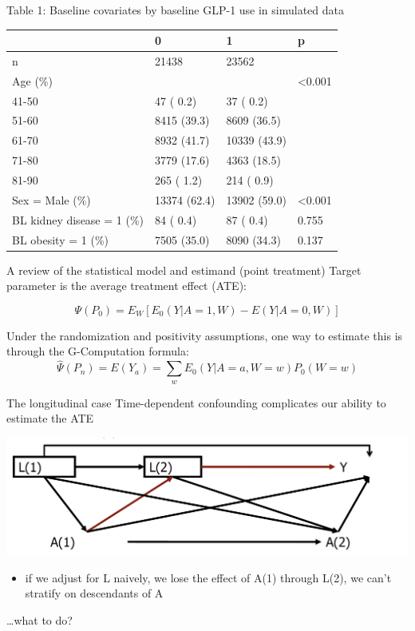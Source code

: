 \documentclass[
  ignorenonframetext,
  twocolumn]{beamer}
\providecommand{\tightlist}{%
  \setlength{\itemsep}{0pt}\setlength{\parskip}{0pt}}
\renewcommand{\tightlist}{\setlength{\itemsep}{2ex}\setlength{\parskip}{0pt}}
\begin{document}
\begin{frame}{Table 1: Baseline covariates by baseline GLP-1 use in
simulated data}
\protect\hypertarget{table-1-baseline-covariates-by-baseline-glp-1-use-in-simulated-data}{}
\begin{tabular}[t]{l|l|l|l}
\hline
  & 0 & 1 & p\\
\hline
n & 21438 & 23562 & \\
\hline
Age (\%) &  &  & <0.001\\
\hline
41-50 & 47 ( 0.2) & 37 ( 0.2) & \\
\hline
51-60 & 8415 (39.3) & 8609 (36.5) & \\
\hline
61-70 & 8932 (41.7) & 10339 (43.9) & \\
\hline
71-80 & 3779 (17.6) & 4363 (18.5) & \\
\hline
81-90 & 265 ( 1.2) & 214 ( 0.9) & \\
\hline
Sex = Male (\%) & 13374 (62.4) & 13902 (59.0) & <0.001\\
\hline
BL kidney disease = 1 (\%) & 84 ( 0.4) & 87 ( 0.4) & 0.755\\
\hline
BL obesity = 1 (\%) & 7505 (35.0) & 8090 (34.3) & 0.137\\
\hline
\end{tabular}
\end{frame}

\begin{frame}{A review of the statistical model and estimand (point
treatment)}
\protect\hypertarget{a-review-of-the-statistical-model-and-estimand-point-treatment}{}
Target parameter is the average treatment effect (ATE):

\[\Psi(P_0) = E_W[E_0(Y|A=1,W) - E(Y|A=0,W)]\]

Under the randomization and positivity assumptions, one way to estimate
this is through the G-Computation formula:
\[\hat{\Psi}(P_n) = E(Y_a) = \sum_w E_0(Y|A=a,W=w)P_0(W=w)\]
\end{frame}

\begin{frame}{The longitudinal case}
\protect\hypertarget{the-longitudinal-case}{}
Time-dependent confounding complicates our ability to estimate the ATE

\begin{center}\includegraphics[width=0.75\linewidth]{identifiability} \end{center}

\begin{itemize}
\tightlist
\item
  if we adjust for L naively, we lose the effect of A(1) through L(2),
  we can't stratify on descendants of A
\end{itemize}

\ldots what to do?
\end{frame}
\end{document}
